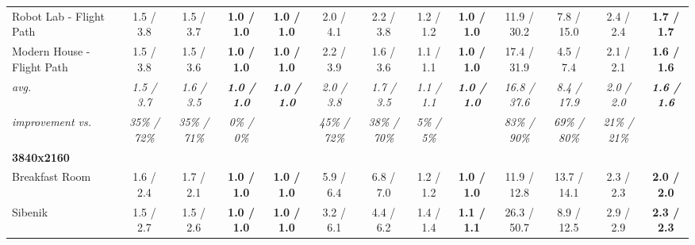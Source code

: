 \begin{table*}[t]
\begin{tabular}{l cccc|cccc|cccc}
	Robot Lab - Flight Path       & 1.5 / 3.8            & 1.5 / 3.7            & \textbf{1.0 / 1.0}          & \textbf{1.0 / 1.0}          & 2.0 / 4.1            & 2.2 / 3.8            & 1.2 / 1.2            & \textbf{1.0 / 1.0}          & 11.9 / 30.2           & 7.8 / 15.0           & 2.4 / 2.4            & \textbf{1.7 / 1.7}          \\
	Modern House - Flight Path    & 1.5 / 3.8            & 1.5 / 3.6            & \textbf{1.0 / 1.0}          & \textbf{1.0 / 1.0}          & 2.2 / 3.9            & 1.6 / 3.6            & 1.1 / 1.1            & \textbf{1.0 / 1.0}          & 17.4 / 31.9           & 4.5 / 7.4            & 2.1 / 2.1            & \textbf{1.6 / 1.6}          \\
	\hline
	\textit{avg.}                 & \textit{1.5 / 3.7}   & \textit{1.6 / 3.5}   & \textit{\textbf{1.0 / 1.0}} & \textit{\textbf{1.0 / 1.0}} & \textit{2.0 / 3.8}   & \textit{1.7 / 3.5}   & \textit{1.1 / 1.1}   & \textit{\textbf{1.0 / 1.0}} & \textit{16.8 / 37.6}  & \textit{8.4 / 17.9}  & \textit{2.0 / 2.0}   & \textit{\textbf{1.6 / 1.6}} \\
	\textit{improvement vs.}      & \textit{35\% / 72\%} & \textit{35\% / 71\%} & \textit{0\% / 0\%}          & \textit{}                   & \textit{45\% / 72\%} & \textit{38\% / 70\%} & \textit{5\% / 5\%}   & \textit{}                   & \textit{83\% / 90\%}  & \textit{69\% / 80\%} & \textit{21\% / 21\%} & \textit{}                   \\
	\hline
	\textbf{3840x2160}            &                      &                      &                      &                      &                      &                      &                      &                      &                      &                      &                      &                      \\
	Breakfast Room                & 1.6 / 2.4            & 1.7 / 2.1            & \textbf{1.0 / 1.0}          & \textbf{1.0 / 1.0}          & 5.9 / 6.4            & 6.8 / 7.0            & 1.2 / 1.2            & \textbf{1.0 / 1.0}          & 11.9 / 12.8           & 13.7 / 14.1          & 2.3 / 2.3            & \textbf{2.0 / 2.0}          \\
	Sibenik                       & 1.5 / 2.7            & 1.5 / 2.6            & \textbf{1.0 / 1.0}          & \textbf{1.0 / 1.0}          & 3.2 / 6.1            & 4.4 / 6.2            & 1.4 / 1.4            & \textbf{1.1 / 1.1}          & 26.3 / 50.7           & 8.9 / 12.5           & 2.9 / 2.9            & \textbf{2.3 / 2.3}          \\

\end{tabular}
\end{table*}
